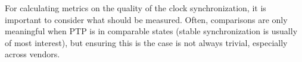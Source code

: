 For calculating metrics on the quality of the clock synchronization, it is important to consider what should be measured. Often, comparisons are only meaningful when PTP is in comparable states (stable synchronization is usually of most interest), but ensuring this is the case is not always trivial, especially across vendors.

